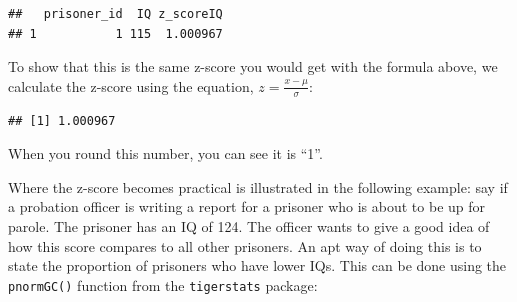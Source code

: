 \documentclass[
]{book}
\newenvironment{Shaded}{\begin{snugshade}}{\end{snugshade}}
\newcommand{\CommentTok}[1]{\textcolor[rgb]{0.56,0.35,0.01}{\textit{#1}}}
\newcommand{\DecValTok}[1]{\textcolor[rgb]{0.00,0.00,0.81}{#1}}
\newcommand{\FunctionTok}[1]{\textcolor[rgb]{0.00,0.00,0.00}{#1}}
\newcommand{\NormalTok}[1]{#1}
\newcommand{\OtherTok}[1]{\textcolor[rgb]{0.56,0.35,0.01}{#1}}
\newcommand{\SpecialCharTok}[1]{\textcolor[rgb]{0.00,0.00,0.00}{#1}}
\begin{document}
\begin{Shaded}
\end{Shaded}

\begin{verbatim}
##   prisoner_id  IQ z_scoreIQ
## 1           1 115  1.000967
\end{verbatim}

To show that this is the same z-score you would get with the formula above, we calculate the z-score using the equation, \(z = \frac{x - \mu}{\sigma}\):

\begin{Shaded}
\end{Shaded}

\begin{verbatim}
## [1] 1.000967
\end{verbatim}

When you round this number, you can see it is ``1''.

Where the z-score becomes practical is illustrated in the following example: say if a probation officer is writing a report for a prisoner who is about to be up for parole. The prisoner has an IQ of 124. The officer wants to give a good idea of how this score compares to all other prisoners. An apt way of doing this is to state the proportion of prisoners who have lower IQs. This can be done using the \texttt{pnormGC()} function from the \texttt{tigerstats} package:
\end{document}
